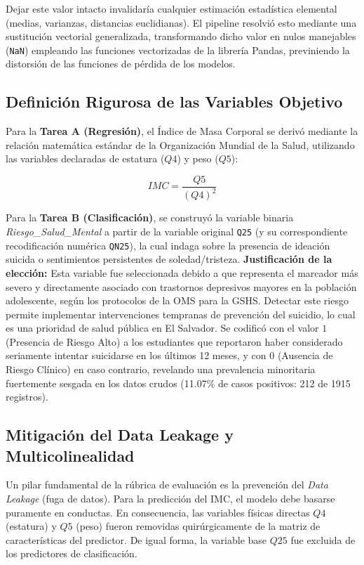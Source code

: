 \documentclass[10pt,journal,compsoc]{IEEEtran}
\begin{document}
Dejar este valor intacto invalidaría cualquier estimación estadística elemental (medias, varianzas, distancias euclidianas). El pipeline resolvió esto mediante una sustitución vectorial generalizada, transformando dicho valor en nulos manejables (\texttt{NaN}) empleando las funciones vectorizadas de la librería Pandas, previniendo la distorsión de las funciones de pérdida de los modelos.

\subsection{Definición Rigurosa de las Variables Objetivo}
Para la \textbf{Tarea A (Regresión)}, el Índice de Masa Corporal se derivó mediante la relación matemática estándar de la Organización Mundial de la Salud, utilizando las variables declaradas de estatura ($Q4$) y peso ($Q5$):

\begin{equation}
IMC = \frac{Q5}{(Q4)^2}
\end{equation}

Para la \textbf{Tarea B (Clasificación)}, se construyó la variable binaria \textit{Riesgo\_Salud\_Mental} a partir de la variable original \texttt{Q25} (y su correspondiente recodificación numérica \texttt{QN25}), la cual indaga sobre la presencia de ideación suicida o sentimientos persistentes de soledad/tristeza. \textbf{Justificación de la elección:} Esta variable fue seleccionada debido a que representa el marcador más severo y directamente asociado con trastornos depresivos mayores en la población adolescente, según los protocolos de la OMS para la GSHS. Detectar este riesgo permite implementar intervenciones tempranas de prevención del suicidio, lo cual es una prioridad de salud pública en El Salvador. Se codificó con el valor $1$ (Presencia de Riesgo Alto) a los estudiantes que reportaron haber considerado seriamente intentar suicidarse en los últimos 12 meses, y con $0$ (Ausencia de Riesgo Clínico) en caso contrario, revelando una prevalencia minoritaria fuertemente sesgada en los datos crudos (11.07\% de casos positivos: 212 de 1915 registros).

\subsection{Mitigación del Data Leakage y Multicolinealidad}
Un pilar fundamental de la rúbrica de evaluación es la prevención del \textit{Data Leakage} (fuga de datos). Para la predicción del IMC, el modelo debe basarse puramente en conductas. En consecuencia, las variables físicas directas $Q4$ (estatura) y $Q5$ (peso) fueron removidas quirúrgicamente de la matriz de características del predictor. De igual forma, la variable base $Q25$ fue excluida de los predictores de clasificación.
\end{document}
